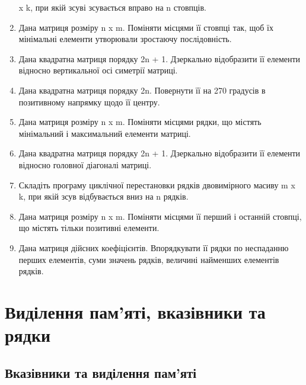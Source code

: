 \documentclass[]{article}
\begin{document}
\begin{enumerate}
x k, при якій зсуві зсувається вправо на n стовпців.
\item
Дана матриця розміру n x m. Поміняти місцями її стовпці так, щоб їх
мінімальні елементи утворювали зростаючу послідовність.
\item
Дана квадратна матриця порядку 2n + 1. Дзеркально відобразити її
елементи відносно вертикальної осі симетрії матриці.
\item
Дана квадратна матриця порядку 2n. Повернути її на 270 градусів в
позитивному напрямку щодо її центру.
\item
Дана матриця розміру n x m. Поміняти місцями рядки, що містять
мінімальний і максимальний елементи матриці.
\item
Дана квадратна матриця порядку 2n + 1. Дзеркально відобразити її
елементи відносно головної діагоналі матриці.
\item
Складіть програму циклічної перестановки рядків двовимірного масиву m x
k, при якій зсув відбувається вниз на n рядків.
\item
Дана матриця розміру n x m. Поміняти місцями її перший і останній
стовпці, що містять тільки позитивні елементи.
\item
Дана матриця дійсних коефіцієнтів. Впорядкувати її рядки по неспаданню
перших елементів, суми значень рядків, величині найменших елементів
рядків.
\end{enumerate}

\section{Виділення пам'яті, вказівники та рядки}

\subsection{Вказівники та виділення пам'яті}
\end{document}
